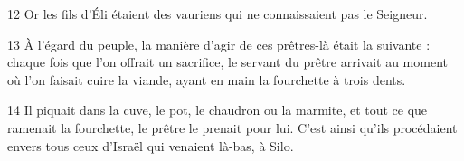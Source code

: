 12 Or les fils d’Éli étaient des vauriens qui ne connaissaient pas le Seigneur.

13 À l’égard du peuple, la manière d’agir de ces prêtres-là était la suivante : chaque fois que l’on offrait un sacrifice, le servant du prêtre arrivait au moment où l’on faisait cuire la viande, ayant en main la fourchette à trois dents.

14 Il piquait dans la cuve, le pot, le chaudron ou la marmite, et tout ce que ramenait la fourchette, le prêtre le prenait pour lui. C’est ainsi qu’ils procédaient envers tous ceux d’Israël qui venaient là-bas, à Silo.
